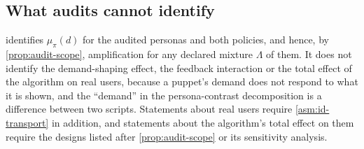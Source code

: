\subsection{What audits cannot identify}\label{sec:id-limits}

 identifies $\mu_\pi(d)$ for the audited personas and both policies, and hence, by \cref{prop:audit-scope}, amplification for any declared mixture $\Lambda$ of them. It does not identify the demand-shaping effect, the feedback interaction or the total effect of the algorithm on real users, because a puppet's demand does not respond to what it is shown, and the ``demand'' in the persona-contrast decomposition is a difference between two scripts. Statements about real users require \cref{asm:id-transport} in addition, and statements about the algorithm's total effect on them require the designs listed after \cref{prop:audit-scope} or its sensitivity analysis.
